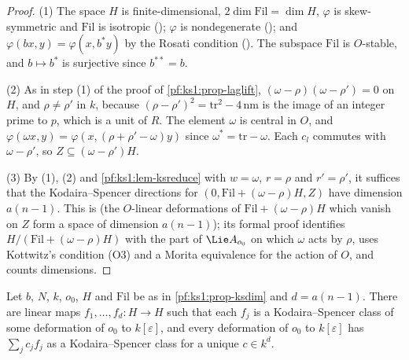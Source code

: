 \begin{proof}
(1) The space $H$ is finite-dimensional, $2\dim\mathrm{Fil}=\dim H$, $\varphi$ is skew-symmetric and $\mathrm{Fil}$ is isotropic
(); $\varphi$ is nondegenerate
(); and $\varphi(bx,y)=\varphi(x,b^*y)$ by the Rosati condition
(). The subspace $\mathrm{Fil}$ is $O$-stable, and $b\mapsto b^*$ is surjective since
$b^{**}=b$.

(2) As in step (1) of the proof of \cref{pf:ks1:prop-laglift}, $(\omega-\rho)(\omega-\rho')=0$ on $H$, and $\rho\neq\rho'$ in $k$, because
$(\rho-\rho')^2=\mathrm{tr}^2-4\,\mathrm{nm}$ is the image of an integer prime to $p$, which is a unit of $R$. The element $\omega$ is central in $O$, and
$\varphi(\omega x,y)=\varphi(x,(\rho+\rho'-\omega)y)$ since $\omega^*=\mathrm{tr}-\omega$. Each $c_l$ commutes with $\omega-\rho'$, so
$Z\subseteq(\omega-\rho')H$.

(3) By (1), (2) and \cref{pf:ks1:lem-ksreduce} with $w=\omega$, $r=\rho$ and $r'=\rho'$, it suffices that the Kodaira--Spencer directions for
$(0,\mathrm{Fil}+(\omega-\rho)H,Z)$ have dimension $a(n-1)$. This is  (the
$O$-linear deformations of $\mathrm{Fil}+(\omega-\rho)H$ which vanish on $Z$ form a space of dimension $a(n-1)$); its formal proof identifies
$H/(\mathrm{Fil}+(\omega-\rho)H)$ with the part of $\Lie A_{o_0}$ on which $\omega$ acts by $\rho$, uses Kottwitz's condition (O3) and a Morita
equivalence for the action of $O$, and counts dimensions.
\end{proof}

\begin{lemma}\label{pf:ks1:lem-fodef}
Let $b$, $N$, $k$, $o_0$, $H$ and $\mathrm{Fil}$ be as in \cref{pf:ks1:prop-ksdim} and $d=a(n-1)$. There are linear maps $f_1,\dots,f_d:H\to H$ such
that each $f_j$ is a Kodaira--Spencer class of some deformation of $o_0$ to $k[\varepsilon]$, and every deformation of $o_0$ to $k[\varepsilon]$ has
$\sum_jc_jf_j$ as a Kodaira--Spencer class for a unique $c\in k^d$.
\end{lemma}

